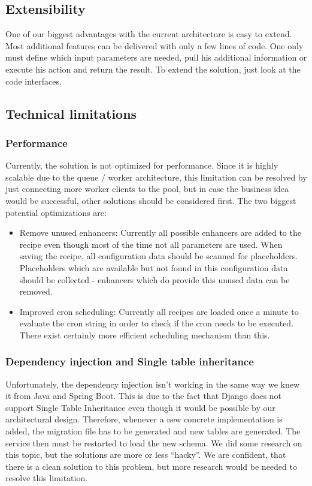 \documentclass[11pt]{article} %
\begin{document}
\subsection{Extensibility}
One of our biggest advantages with the current architecture is easy to extend. Most additional features can be delivered with only a few lines of code. One only must define which input parameters are needed, pull his additional information or execute his action and return the result. To extend the solution, just look at the code interfaces.

\subsection{Technical limitations}
\subsubsection{Performance}
Currently, the solution is not optimized for performance. Since it is highly scalable due to the queue / worker architecture, this limitation can be resolved by just connecting more worker clients to the pool, but in case the business idea would be successful, other solutions should be considered first. The two biggest potential optimizations are:\\
\begin{itemize}
  \item Remove unused enhancers: Currently all possible enhancers are added to the recipe even though most of the time not all parameters are used. When saving the recipe, all configuration data should be scanned for placeholders. Placeholders which are available but not found in this configuration data should be collected - enhancers which do provide this unused data can be removed.
  \item Improved cron scheduling: Currently all recipes are loaded once a minute to evaluate the cron string in order to check if the cron needs to be executed. There exist certainly more efficient scheduling mechanism than this.
\end{itemize}

\subsubsection{Dependency injection and Single table inheritance}
Unfortunately, the dependency injection isn’t working in the same way we knew it from Java and Spring Boot. This is due to the fact that Django does not support Single Table Inheritance even though it would be possible by our architectural design. Therefore, whenever a new concrete implementation is added, the migration file has to be generated and new tables are generated. The service then must be restarted to load the new schema. We did some research on this topic, but the solutions are more or less “hacky”. We are confident, that there is a clean solution to this problem, but more research would be needed to resolve this limitation.
\end{document}
